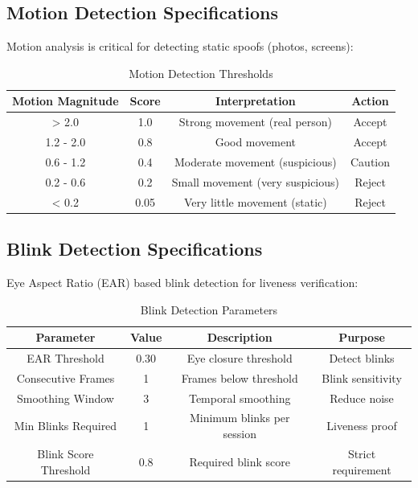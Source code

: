 \documentclass[12pt,a4paper]{article}
\begin{document}
\subsection{Motion Detection Specifications}

Motion analysis is critical for detecting static spoofs (photos, screens):

\begin{table}[h!]
\centering
\caption{Motion Detection Thresholds}
\begin{tabular}{|c|c|c|c|}
\hline
\textbf{Motion Magnitude} & \textbf{Score} & \textbf{Interpretation} & \textbf{Action} \\
\hline
> 2.0 & 1.0 & Strong movement (real person) & Accept \\
\hline
1.2 - 2.0 & 0.8 & Good movement & Accept \\
\hline
0.6 - 1.2 & 0.4 & Moderate movement (suspicious) & Caution \\
\hline
0.2 - 0.6 & 0.2 & Small movement (very suspicious) & Reject \\
\hline
< 0.2 & 0.05 & Very little movement (static) & Reject \\
\hline
\end{tabular}
\end{table}

\subsection{Blink Detection Specifications}

Eye Aspect Ratio (EAR) based blink detection for liveness verification:

\begin{table}[h!]
\centering
\caption{Blink Detection Parameters}
\begin{tabular}{|c|c|c|c|}
\hline
\textbf{Parameter} & \textbf{Value} & \textbf{Description} & \textbf{Purpose} \\
\hline
EAR Threshold & 0.30 & Eye closure threshold & Detect blinks \\
\hline
Consecutive Frames & 1 & Frames below threshold & Blink sensitivity \\
\hline
Smoothing Window & 3 & Temporal smoothing & Reduce noise \\
\hline
Min Blinks Required & 1 & Minimum blinks per session & Liveness proof \\
\hline
Blink Score Threshold & 0.8 & Required blink score & Strict requirement \\
\hline
\end{tabular}
\end{table}
\end{document}
